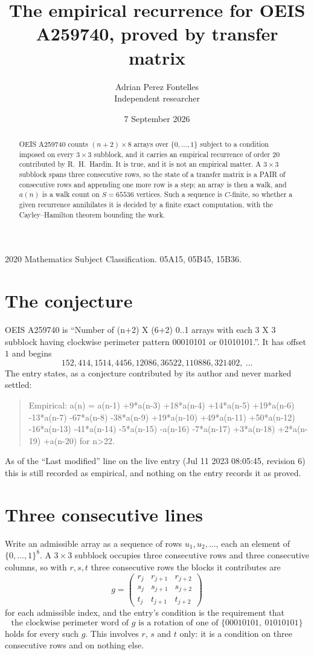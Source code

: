 \documentclass[11pt,a4paper]{article}
\title{The empirical recurrence for OEIS A259740, proved by transfer matrix}
\author{Adrian Perez Fontelles\\ \small Independent researcher}
\date{7 September 2026}
\theoremstyle{plain}
\theoremstyle{definition}
\begin{document}
\maketitle

\begin{abstract}
OEIS A259740 counts $(n+2)\times8$ arrays over $\{0,\dots,1\}$ subject to a condition imposed on
every $3\times3$ subblock, and it carries an empirical recurrence of order $20$
contributed by R.~H.~Hardin. It is true, and it is not an empirical matter. A $3\times3$
subblock spans three consecutive rows, so the state of a transfer matrix is a PAIR of
consecutive rows and appending one more row is a step; an array is then a walk, and
$a(n)$ is a walk count on $S=65536$ vertices. Such a sequence is $C$-finite, so whether a given
recurrence annihilates it is decided by a finite exact computation, with the Cayley--Hamilton
theorem bounding the work.
\end{abstract}

\noindent\small 2020 Mathematics Subject Classification. 05A15, 05B45, 15B36.\normalsize

\section{The conjecture}

OEIS A259740 is ``Number of (n+2) X (6+2) 0..1 arrays with each 3 X 3 subblock having clockwise perimeter pattern 00010101 or 01010101.''. It has offset $1$ and begins
\[
152, 414, 1514, 4456, 12086, 36522, 110886, 321402,\ \dots
\]
The entry states, as a conjecture contributed by its author and never marked settled:
\begin{quote}
Empirical: a(n) = a(n-1) +9*a(n-3) +18*a(n-4) +14*a(n-5) +19*a(n-6) -13*a(n-7) -67*a(n-8) -38*a(n-9) +19*a(n-10) +49*a(n-11) +50*a(n-12) -16*a(n-13) -41*a(n-14) -5*a(n-15) -a(n-16) -7*a(n-17) +3*a(n-18) +2*a(n-19) +a(n-20) for n>22.
\end{quote}
As of the ``Last modified'' line on the live entry (Jul 11 2023 08:05:45, revision 6) this is still
recorded as empirical, and nothing on the entry records it as proved.

\section{Three consecutive lines}

Write an admissible array as a sequence of rows $u_1,u_2,\dots$, each an element of
$\{0,\dots,1\}^{8}$. A $3\times3$ subblock occupies three consecutive rows and
three consecutive columns, so with $r,s,t$ three consecutive rows the blocks it
contributes are
\[
g=\begin{pmatrix}r_j&r_{j+1}&r_{j+2}\\ s_j&s_{j+1}&s_{j+2}\\ t_j&t_{j+1}&t_{j+2}\end{pmatrix}
\]
for each admissible index, and the entry's condition is the requirement that
\[
\text{the clockwise perimeter word of }g\text{ is a rotation of one of }\{00010101,\ 01010101\}
\]
holds for every such $g$. This involves $r$, $s$ and $t$ only: it is a condition on
three consecutive rows and on nothing else.
\end{document}
